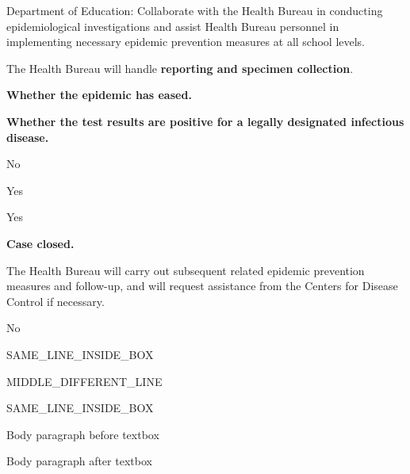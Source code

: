 \documentclass[11pt,a4paper]{article}
\begin{document}
\begin{figure}[h]
\end{figure}

Department of Education:
Collaborate with the Health Bureau in conducting epidemiological investigations and assist Health Bureau personnel in implementing necessary epidemic prevention measures at all school levels.

\begin{figure}[h]
\end{figure}

\begin{figure}[h]
\end{figure}

The Health Bureau will handle \textbf{reporting and specimen collection}.

\begin{figure}[h]
\end{figure}

\begin{figure}[h]
\end{figure}

\textbf{Whether the epidemic has eased.}

\begin{figure}[h]
\end{figure}

\textbf{Whether the test results are positive for a legally designated infectious disease.}

No

\begin{figure}[h]
\end{figure}

\begin{figure}[h]
\end{figure}

Yes

\begin{figure}[h]
\end{figure}

Yes

\begin{figure}[h]
\end{figure}

\textbf{Case closed.}

The Health Bureau will carry out subsequent related epidemic prevention measures and follow-up, and will request assistance from the Centers for Disease Control if necessary.

\begin{figure}[h]
\end{figure}

No

\begin{figure}[h]
\end{figure}

\begin{figure}[h]
\end{figure}

SAME\_LINE\_INSIDE\_BOX

MIDDLE\_DIFFERENT\_LINE

SAME\_LINE\_INSIDE\_BOX

\begin{figure}[h]
\end{figure}

Body paragraph before textbox

Body paragraph after textbox
\end{document}
